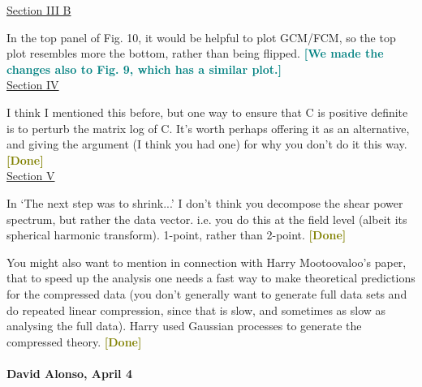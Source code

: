 \documentclass{article}
\newcommand\reply[1]{{\bf {\textcolor{teal}{[#1]}}}}
\newcommand\done{{\bf {\textcolor{olive}{[Done]}}}}
\begin{document}
    \underline{Section III B}
    
    In the top panel of Fig. 10, it would be helpful to plot GCM/FCM, so the top plot resembles more the bottom, rather than being flipped. \reply{We made the changes also to Fig. 9, which has a similar plot.}\\
    
    \underline{Section IV}
    
    I think I mentioned this before, but one way to ensure that C is positive definite is to perturb the matrix log of C.  It’s worth perhaps offering it as an alternative, and giving the argument (I think you had one) for why you don’t do it this way. \done \\
    
    \underline{Section V}
    
    In ‘The next step was to shrink...’ I don’t think you decompose the shear power spectrum, but rather the data vector.  i.e. you do this at the field level (albeit its spherical harmonic transform).  1-point, rather than 2-point. \done

    You might also want to mention in connection with Harry Mootoovaloo’s paper, that to speed up the analysis one needs a fast way to make theoretical predictions for the compressed data (you don’t generally want to generate full data sets and do repeated linear compression, since that is slow, and sometimes as slow as analysing the full data).  Harry used Gaussian processes to generate the compressed theory. \done \\  \\
	
	
	\textbf{David Alonso, April 4} \\
\end{document}
